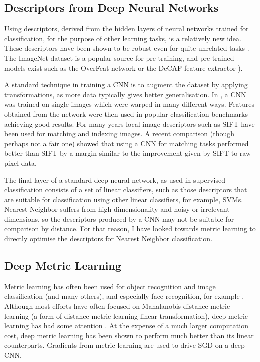 \subsection {Descriptors from Deep Neural Networks}

Using descriptors, derived from the hidden layers of neural networks trained for classification, for the purpose of other learning tasks, is a relatively new idea. These descriptors have been shown to be robust even for quite unrelated tasks \cite{Donahue2014,Razavian2014}. The ImageNet dataset \cite{Krizhevsky2012} is a popular source for pre-training, and pre-trained models exist such as the OverFeat network \cite{Sermanet2013} or the DeCAF feature extractor \cite{Donahue2014}). 

A standard technique in training a \gls{CNN} is to augment the dataset by applying transformations, as more data typically gives better generalisation. In \cite{Dosovitskiy2013}, a \gls{CNN} was trained on single images which were warped in many different ways. Features obtained from the network were then used in popular classification benchmarks achieving good results. For many years local image descriptors such as \gls{SIFT} \cite{Lowe2004} have been used for matching and indexing images.  A recent comparison \cite{Fischer2014} (though perhaps not a fair one) showed that using a \gls{CNN} for matching tasks performed better than \gls{SIFT} by a margin similar to the improvement given by \gls{SIFT} to raw pixel data.


The final layer of a standard deep neural network, as used in supervised classification consists of a set of linear classifiers, such as those descriptors that are suitable for classification using other linear classifiers, for example, \gls{SVM}s. Nearest Neighbor suffers from high dimensionality and noisy or irrelevant dimensions, so the descriptors produced by a CNN may not be suitable for comparison by distance. For that reason, I have looked towards metric learning to directly optimise the descriptors for Nearest Neighbor classification. 


\subsection {Deep Metric Learning}


Metric learning has often been used for object recognition and image classification \cite{Hadsell2006,Min2009} (and many others), and especially face recognition, for example \cite{Kostinger2012}. Although most efforts have often focused on Mahalanobis distance metric learning (a form of distance metric learning linear transformation), deep metric learning has had some attention \cite {Salakhutdinov2007a,Min2009,Weston2009,Min2010}. At the expense of a much larger computation cost, deep metric learning has been shown to perform much better than its linear counterparts. Gradients from metric learning are used to drive \gls{SGD} on a deep \gls{CNN}. 

